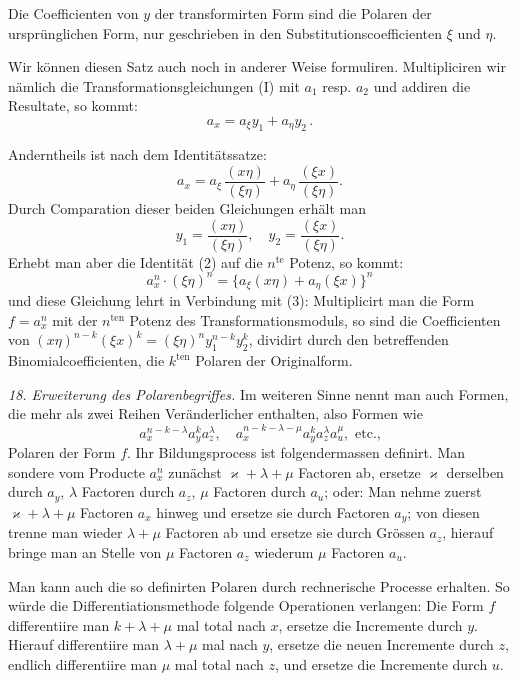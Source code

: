 \documentclass[11pt]{article}
\providecommand{\weberpage}[1]{}
\providecommand{\weq}[2]{\begin{equation}\tag{#1}#2\end{equation}}
\begin{document}
\glqq Die Coefficienten von $y$ der transformirten Form sind die Polaren der ursprünglichen Form, nur geschrieben in den Substitutionscoefficienten $\xi$ und $\eta$.\grqq{}

Wir können diesen Satz auch noch in anderer Weise formuliren. Multipliciren wir nämlich die Transformationsgleichungen (I) mit $a_1$ resp. $a_2$ und addiren die Resultate, so kommt:
\weq{1}{a_x = a_\xi y_1+a_\eta y_2\,.}


\weberpage{21}
Anderntheils ist nach dem Identitätssatze:
\weq{2}{a_x = a_\xi\,\frac{(x\eta)}{(\xi\eta)} + a_\eta\,\frac{(\xi x)}{(\xi\eta)}.}
Durch Comparation dieser beiden Gleichungen erhält man
\weq{3}{y_1 = \frac{(x\eta)}{(\xi\eta)}, \quad y_2 = \frac{(\xi x)}{(\xi\eta)}.}
Erhebt man aber die Identität (2) auf die $n^{\text{te}}$ Potenz, so kommt:
\[
a_x^n \cdot (\xi\eta)^n = \{a_\xi(x\eta) + a_\eta(\xi x)\}^n
\]
und diese Gleichung lehrt in Verbindung mit (3):
\glqq Multiplicirt man die Form $f = a_x^n$ mit der $n^{\text{ten}}$ Potenz des Transformationsmoduls, so sind die Coefficienten von $(x\eta)^{n-k}(\xi x)^k = (\xi\eta)^n y_1^{n-k} y_2^k$, dividirt durch den betreffenden Binomialcoefficienten, die $k^{\text{ten}}$ Polaren der Originalform.\grqq{}

\textit{18. Erweiterung des Polarenbegriffes.} Im weiteren Sinne nennt man auch Formen, die mehr als zwei Reihen Veränderlicher enthalten, also Formen wie
\[
a_x^{n-k-\lambda}a_y^k a_z^\lambda, \quad a_x^{n-k-\lambda-\mu}a_y^k a_z^\lambda a_u^\mu, \text{ etc.,}
\]
Polaren der Form $f$. Ihr Bildungsprocess ist folgendermassen definirt. Man sondere vom Producte $a_x^n$ zunächst $\varkappa+\lambda+\mu$ Factoren ab, ersetze $\varkappa$ derselben durch $a_y$, $\lambda$ Factoren durch $a_z$, $\mu$ Factoren durch $a_u$; oder: Man nehme zuerst $\varkappa+\lambda+\mu$ Factoren $a_x$ hinweg und ersetze sie durch Factoren $a_y$; von diesen trenne man wieder $\lambda+\mu$ Factoren ab und ersetze sie durch Grössen $a_z$, hierauf bringe man an Stelle von $\mu$ Factoren $a_z$ wiederum $\mu$ Factoren $a_u$.

Man kann auch die so definirten Polaren durch rechnerische Processe erhalten. So würde die Differentiationsmethode folgende Operationen verlangen: Die Form $f$ differentiire man $k+\lambda+\mu$ mal total nach $x$, ersetze die Incremente durch $y$.
Hierauf differentiire man $\lambda+\mu$ mal nach $y$, ersetze die neuen Incremente durch $z$, endlich differentiire man $\mu$ mal total nach $z$, und ersetze die Incremente durch $u$.
\end{document}
